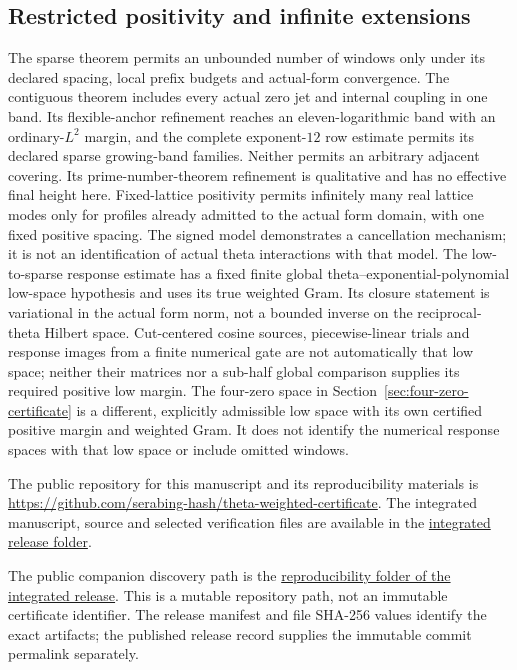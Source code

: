 \documentclass[11pt,a4paper]{article}
\numberwithin{equation}{section}
\theoremstyle{definition}\newtheorem{definition}[theorem]{Definition}
\theoremstyle{remark}\newtheorem{remark}[theorem]{Remark}
\begin{document}
\subsection{Restricted positivity and infinite extensions}
The sparse theorem permits an unbounded number of windows only under its declared spacing, local prefix budgets and actual-form convergence. The contiguous theorem includes every actual zero jet and internal coupling in one band. Its flexible-anchor refinement reaches an eleven-logarithmic band with an ordinary-$L^2$ margin, and the complete exponent-$12$ row estimate permits its declared sparse growing-band families. Neither permits an arbitrary adjacent covering. Its prime-number-theorem refinement is qualitative and has no effective final height here. Fixed-lattice positivity permits infinitely many real lattice modes only for profiles already admitted to the actual form domain, with one fixed positive spacing. The signed model demonstrates a cancellation mechanism; it is not an identification of actual theta interactions with that model. The low-to-sparse response estimate has a fixed finite global theta--exponential-polynomial low-space hypothesis and uses its true weighted Gram. Its closure statement is variational in the actual form norm, not a bounded inverse on the reciprocal-theta Hilbert space. Cut-centered cosine sources, piecewise-linear trials and response images from a finite numerical gate are not automatically that low space; neither their matrices nor a sub-half global comparison supplies its required positive low margin. The four-zero space in Section~\ref{sec:four-zero-certificate} is a different, explicitly admissible low space with its own certified positive margin and weighted Gram. It does not identify the numerical response spaces with that low space or include omitted windows.

The public repository for this manuscript and its reproducibility materials is \url{https://github.com/serabing-hash/theta-weighted-certificate}. The integrated manuscript, source and selected verification files are available in the \href{https://github.com/serabing-hash/theta-weighted-certificate/tree/main/papers/2026-11-03-unified-theta-energy-v4}{integrated release folder}.

The public companion discovery path is the \href{https://github.com/serabing-hash/theta-weighted-certificate/tree/main/papers/2026-11-03-unified-theta-energy-v4/source_inputs/v3_support/reproducibility}{reproducibility folder of the integrated release}. This is a mutable repository path, not an immutable certificate identifier. The release manifest and file SHA-256 values identify the exact artifacts; the published release record supplies the immutable commit permalink separately.
\end{document}
